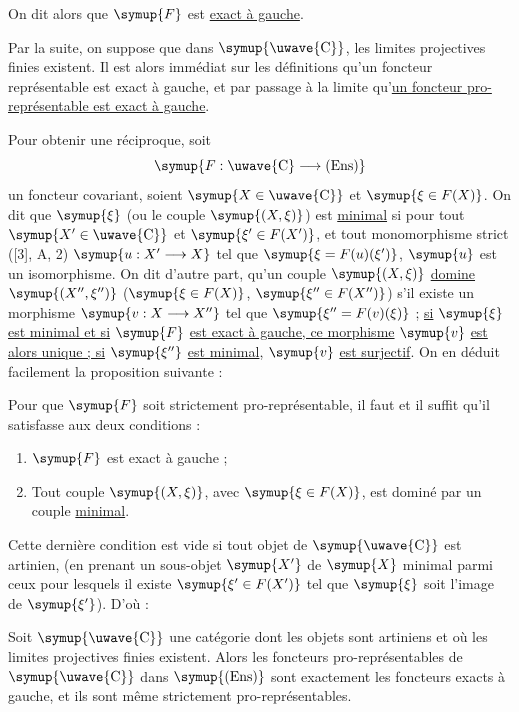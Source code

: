 On dit alors que $\symup{F}$ est \uline{exact à gauche}.

Par la suite, on suppose que dans $\symup{\text{\uwave{C}}}$, les limites projectives finies existent. Il est alors immédiat sur les définitions qu'un foncteur
représentable est exact à gauche, et par passage à la limite qu'\uline{un foncteur pro-représentable est exact à gauche}.

Pour obtenir une réciproque, soit
\[
  \symup{F:\text{\uwave{C}}\longrightarrow(\operatorname{Ens})}
\]
un foncteur covariant, soient $\symup{X\in\text{\uwave{C}}}$ et $\symup{\xi\in F(X)}$. On dit que
$\symup{\xi}$ (ou le couple $\symup{(X,\xi)}$) est \uline{minimal} si pour tout
$\symup{X'\in\text{\uwave{C}}}$ et $\symup{\xi'\in F(X')}$, et tout monomorphisme strict ([3], A, 2)
$\symup{u:X'\longrightarrow X}$ tel que $\symup{\xi=F(u)(\xi')}$, $\symup{u}$ est un isomorphisme. On
dit d'autre part, qu'un couple $\symup{(X,\xi)}$ \uline{domine} $\symup{(X'',\xi'')}$
($\symup{\xi\in F(X)}$, $\symup{\xi''\in F(X'')}$) s'il existe un morphisme
$\symup{v:X\longrightarrow X''}$ tel que $\symup{\xi''=F(v)(\xi)}$ ; \uline{si} $\symup{\xi}$ \uline{est minimal et
si} $\symup{F}$ \uline{est exact à gauche, ce morphisme} $\symup{v}$ \uline{est alors unique ; si} $\symup{\xi''}$ \uline{est
minimal}, $\symup{v}$ \uline{est surjectif}. On en déduit facilement la proposition suivante :

 Pour que $\symup{F}$ soit strictement pro-représentable, il
faut et il suffit qu'il satisfasse aux deux conditions :
\begin{enumerate}
\item[i.] $\symup{F}$ est exact à gauche ;
\item[ii.] Tout couple $\symup{(X,\xi)}$, avec $\symup{\xi\in F(X)}$, est dominé par un couple \uline{minimal}.
\end{enumerate}

Cette dernière condition est vide si tout objet de $\symup{\text{\uwave{C}}}$ est artinien, (en prenant un sous-objet $\symup{X'}$ de $\symup{X}$ minimal parmi ceux pour lesquels il
existe $\symup{\xi'\in F(X')}$ tel que $\symup{\xi}$ soit l'image de $\symup{\xi'}$). D'où :

 Soit $\symup{\text{\uwave{C}}}$ une catégorie dont les objets sont
artiniens et où les limites projectives finies existent. Alors les foncteurs
pro-représentables de $\symup{\text{\uwave{C}}}$ dans $\symup{(\operatorname{Ens})}$ sont exactement
les foncteurs exacts à gauche, et ils sont même strictement
pro-représentables.

